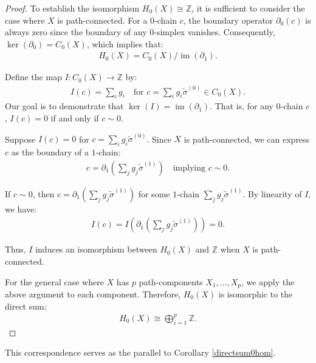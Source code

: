 \begin{proof}
	To establish the isomorphism \( H_{0}(X) \cong \mathbb{Z} \), it is sufficient to consider the case where \( X \) is path-connected. For a \( 0 \)-chain \( c \), the boundary operator \( \partial_{0}(c) \) is always zero since the boundary of any \( 0 \)-simplex vanishes. Consequently, \( \ker(\partial_{0}) = C_{0}(X) \), which implies that:
	\begin{align}
		H_{0}(X) = C_{0}(X) / \operatorname{im}(\partial_{1}). 
	\end{align}
			
	Define the map \( I: C_{0}(X) \to \mathbb{Z} \) by:
	\begin{align}
		I(c) = \sum_{i} g_{i} \quad \text{for } c = \sum_{i} g_{i} \tilde{\sigma}^{(0)} \in C_{0}(X). 
	\end{align}
	Our goal is to demonstrate that \( \ker(I) = \operatorname{im}(\partial_{1}) \). That is, for any \( 0 \)-chain \( c \), \( I(c) = 0 \) if and only if \( c \sim 0 \).
			
	Suppose \( I(c) = 0 \) for \( c = \sum_{i} g_{i} \tilde{\sigma}^{(0)} \). Since \( X \) is path-connected, we can express \( c \) as the boundary of a \( 1 \)-chain:
	\begin{align}
		c = \partial_{1} \left( \sum_{j} g_{j} \tilde{\sigma}^{(1)} \right) \quad \text{implying } c \sim 0. 
	\end{align}
			
	If \( c \sim 0 \), then \( c = \partial_{1} \left( \sum_{j} g_{j} \tilde{\sigma}^{(1)} \right) \) for some \( 1 \)-chain \( \sum_{j} g_{j} \tilde{\sigma}^{(1)} \). By linearity of \( I \), we have:
	\begin{align}
		I(c) = I \left( \partial_{1} \left( \sum_{j} g_{j} \tilde{\sigma}^{(1)} \right) \right) = 0. 
	\end{align}
			
	Thus, \( I \) induces an isomorphism between \( H_{0}(X) \) and \( \mathbb{Z} \) when \( X \) is path-connected.
			
	For the general case where \( X \) has \( p \) path-components \( X_{1}, \ldots, X_{p} \), we apply the above argument to each component. Therefore, \( H_{0}(X) \) is isomorphic to the direct sum:
	\begin{align}
		H_{0}(X) \cong \bigoplus_{i=1}^{p} \mathbb{Z}. 
	\end{align}
\end{proof}

This correspondence serves as the parallel to Corollary \ref{directsum0hom}.

